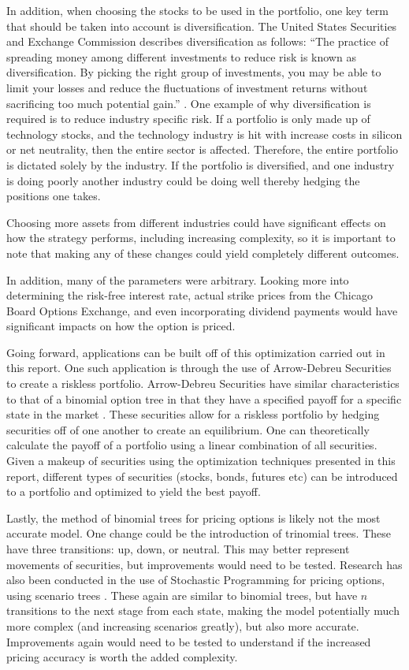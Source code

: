 \documentclass[12pt]{article}
\begin{document}
In addition, when choosing the stocks to be used in the portfolio, one key term that should be taken into account is diversification. The United States Securities and Exchange Commission describes diversification as follows: “The practice of spreading money among different investments to reduce risk is known as diversification. By picking the right group of investments, you may be able to limit your losses and reduce the fluctuations of investment returns without sacrificing too much potential gain.” \cite{diversity}.  One example of why diversification is required is to reduce industry specific risk. If a portfolio is only made up of technology stocks, and the technology industry is hit with increase costs in silicon or net neutrality, then the entire sector is affected. Therefore, the entire portfolio is dictated solely by the industry. If the portfolio is diversified, and one industry is doing poorly another industry could be doing well thereby hedging the positions one takes. 

Choosing more assets from different industries could have significant effects on how the strategy performs, including increasing complexity, so it is important to note that making any of these changes could yield completely different outcomes.

In addition, many of the parameters were arbitrary. Looking more into determining the risk-free interest rate, actual strike prices from the Chicago Board Options Exchange, and even incorporating dividend payments would have significant impacts on how the option is priced. 
	
Going forward, applications can be built off of this optimization carried out in this report. One such application is through the use of Arrow-Debreu Securities to create a riskless portfolio. Arrow-Debreu Securities have similar characteristics to that of a binomial option tree in that they have a specified payoff for a specific state in the market \cite{tirole2010theory, AD_secs}. These securities allow for a riskless portfolio by hedging securities off of one another to create an equilibrium. One can theoretically calculate the payoff of a portfolio using a linear combination of all securities. Given a makeup of securities using the optimization techniques presented in this report, different types of securities (stocks, bonds, futures etc) can be introduced to a portfolio and optimized to yield the best payoff.
	
Lastly, the method of binomial trees for pricing options is likely not the most accurate model. One change could be the introduction of trinomial trees. These have three transitions: up, down, or neutral. This may better represent movements of securities, but improvements would need to be tested. Research has also been conducted in the use of Stochastic Programming for pricing options, using scenario trees \cite{stoc_prog_option}. These again are similar to binomial trees, but have $n$ transitions to the next stage from each state, making the model potentially much more complex (and increasing scenarios greatly), but also more accurate. Improvements again would need to be tested to understand if the increased pricing accuracy is worth the added complexity.
\end{document}
